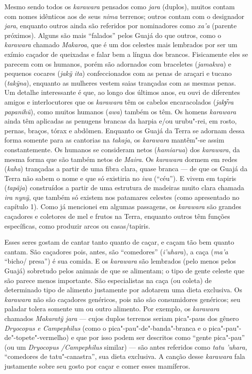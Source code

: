 Mesmo sendo todos os \emph{karawara} pensados como \emph{jara} (duplos),
muitos contam com nomes idênticos aos de seus \emph{nima} terrenos;
outros contam com o designador \emph{jara}, enquanto outros ainda são
referidos por nominadores como \emph{xa'a} (parente próximos). Alguns
são mais ``falados'' pelos Guajá do que outros, como o \emph{karawara}
chamado \emph{Makaroa}, que é um dos celestes mais lembrados por ser um
exímio caçador de queixadas e falar bem a língua dos brancos.
Fisicamente eles se parecem com os humanos, porém são adornados com
braceletes (\emph{jamakwa}) e pequenos cocares (\emph{jakỹ ita})
confeccionados com as penas de araçari e tucano (\emph{takỹna}),
enquanto as mulheres vestem saias trançadas com as mesmas penas. Um
detalhe interessante é que, ao longo dos últimos anos, eu ouvi de
diferentes amigos e interlocutores que os \emph{karawara} têm os cabelos
encaracolados (\emph{jaky᷉ra papanihũ}), como muitos humanos
(\emph{awa}) também os têm. Os homens \emph{karawara} ainda têm
aplicadas as penugens brancas da harpia e/ou urubu"-rei, em rosto,
pernas, braços, tórax e abdômen. Enquanto os Guajá da Terra se adornam
dessa forma somente para as cantorias na \emph{takaja}, os
\emph{karawara} mantêm"-se assim constantemente. Os humanos se consideram
netos (\emph{hamiarua}) dos \emph{karawara}, da mesma forma que são
também netos de \emph{Maira}. Os \emph{karawara} dormem em redes
(\emph{kaha}) trançadas a partir de uma fibra clara, quase branca --- de
que os Guajá da Terra não sabem o nome e que só existiria no \emph{iwa}
(``céu''). E vivem em tapiris (\emph{tapãja}) construídos a partir de
uma estrutura de madeiras muito clara chamada \emph{ira} \emph{nynỹ},
que também só existem nos patamares celestes (como apresentado no
capítulo 1). Como já mencionei em algumas passagens, os \emph{karawara}
são grandes caçadores e coletores de mel e frutos na Terra, enquanto
outros têm funções específicas, como produzir arcos ou casas/tapiris.

Esses seres gostam de cantar tanto quanto de caçar, e caçam tão bem
quanto cantam. São caçadores pois, antes, são ``comedores''
(\emph{i'uhara}), a caça (\emph{ma'a} ``bicho/ presa'') é sua comida. E
os \emph{karawara} são lembrados (pelo menos pelos Guajá) sobretudo
pelos animais de que se alimentam; o tipo de gente celeste que são
parece menos importante. São especialistas na caça (ou coleta) de
determinado tipo de alimento justamente por adotarem uma dieta
exclusiva. Os \emph{karawara} não são caçadores genéricos, pois não são
consumidores genéricos; seu paladar tolera somente um ou outro alimento.
Por exemplo, os \emph{karawara} chamados \emph{Makaratỹ jara} --- cujos
duplos terrenos seriam pica"-paus dos gênero \emph{Dryocopus e
Campephilus} (como o pica"-pau"-de"-banda"-branca e o
pica"-pau"-de"-topete"-vermelho) e que por isso podem ser descritos como
``gente pica"-pau'' (ou um \emph{Dryocopus /Campephilus} similar) --- são
antes referidos como \emph{tatu 'uhara,} ``comedores de tatu"-canastra'',
sua dieta exclusiva. A canção desse \emph{karawara} fala justamente
sobre seu gosto por caçar e comer esses mamíferos.

